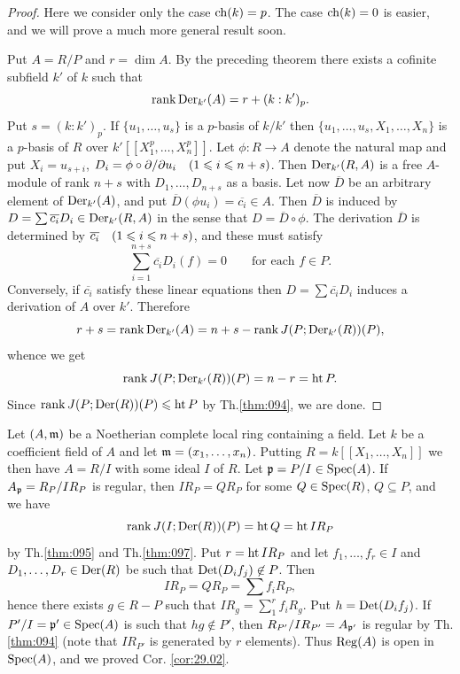 \documentclass[../main]{subfiles}
\begin{document}
\begin{proof}
Here we consider only the case $\operatorname{ch}(k) = p$. The case $\operatorname{ch}(k) = 0$ is easier, and we will prove a much more general result soon.

Put $A = R/P$ and $r = \dim A$. By the preceding theorem there exists a cofinite subfield $k'$ of $k$ such that
\[
\operatorname{rank} \operatorname{Der}_{k'}(A) = r + (k : k')_p.
\]
Put $s = (k : k')_p$. If $\{u_1, \ldots, u_s\}$ is a $p$-basis of $k/k'$ then $\{u_1, \ldots, u_s, X_1, \ldots, X_n\}$ is a $p$-basis of $R$ over $k'[[X_1^p, \ldots, X_n^p]]$. Let $\phi : R \longrightarrow A$ denote the natural map and put $X_i = u_{s + i}$, $D_i = \phi \circ \partial/\partial u_i\for{1 \le i \le n + s}$. Then $\operatorname{Der}_{k'}(R, A)$ is a free $A$-module of rank $n + s$ with $D_1, \ldots, D_{n + s}$ as a basis. Let now $\overline D$ be an arbitrary element of $\operatorname{Der}_{k'}(A)$, and put $\overline D(\phi u_i) = \overline {c_i} \in A$. Then $\overline D$ is induced by $D = \sum \overline {c_i} D_i \in \operatorname{Der}_{k'}(R, A)$ in the sense that $D=\overline D \circ \phi$. The derivation $\overline D$ is determined by $\overline {c_i}\for{1 \le i \le n + s}$, and these must satisfy
\[
\sum_{i = 1}^{n + s} \overline {c_i} D_i(f) = 0 \qquad \text {for each } f \in P.
\]
Conversely, if $\overline {c_i}$ satisfy these linear equations then $D = \sum \overline {c_i} D_i$ induces a derivation of $A$ over $k'$. Therefore \[r + s = \operatorname{rank} \operatorname{Der}_{k'}(A) = n + s - \operatorname{rank} J(P; \operatorname{Der}_{k'}(R))(P),\]
whence we get \[\operatorname{rank} J(P; \operatorname{Der}_{k'}(R))(P) = n - r = \operatorname{ht} P.\] Since $\operatorname{rank} J(P; \operatorname{Der}(R))(P) \leqslant \operatorname{ht} P$ by Th.\ref{thm:094}, we are done. 
\end{proof}

\newparagraph Let $(A, \mathfrak{m})$ be a Noetherian complete local ring containing a field. Let $k$ be a coefficient field of $A$ and let $\mathfrak{m} = (x_1, \dots, x_n)$. Putting $R = k[[X_1, \ldots, X_n]]$ we then have $A = R/I$ with some ideal $I$ of $R$. Let $\mathfrak{p} = P/I \in \operatorname{Spec}(A)$. If $A_{\mathfrak{p}} = R_P/I R_P$ is regular, then $I R_P = Q R_P$ for some $Q \in \operatorname{Spec}(R)$, $Q \subseteq P$, and we have \[\operatorname{rank} J(I; \operatorname{Der}(R))(P) = \operatorname{ht} Q = \operatorname{ht} I R_P\] by Th.\ref{thm:095} and Th.\ref{thm:097}. Put $r = \operatorname{ht} IR_P$ and let $f_1, \ldots, f_r \in I$ and\newline $D_1, \dots, D_r \in \operatorname{Der}(R)$ be such that $\operatorname{Det}(D_i f_j) \not \in P$. Then \[I R_P = Q R_P = \sum f_i R_P,\] hence there exists $g \in R - P$ such that $IR_g = \sum_1^r f_i R_g$. Put $h = \operatorname{Det}(D_i f_j)$. If $P'/I = {\mathfrak{p}}' \in \operatorname{Spec}(A)$ is such that $h g \not \in P'$, then $R_{P'}/I R_{P'} = A_{{\mathfrak{p}}'}$ is regular by Th.\ref{thm:094} (note that $I R_{P'}$ is generated by $r$ elements). Thus $\operatorname{Reg}(A)$ is open in $\operatorname{Spec}(A)$, and we proved Cor. \ref{cor:29.02}.
\end{document}
